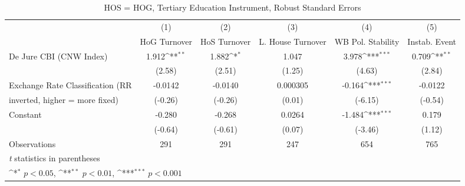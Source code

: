 \begin{table}[htbp]\centering
\def\sym#1{\ifmmode^{#1}\else\(^{#1}\)\fi}
\caption{HOS = HOG, Tertiary Education Instrument, Robust Standard Errors \label{hoshogfivs}}
\begin{tabular}{l*{5}{c}}
\toprule
                                        &\multicolumn{1}{c}{(1)}&\multicolumn{1}{c}{(2)}&\multicolumn{1}{c}{(3)}&\multicolumn{1}{c}{(4)}&\multicolumn{1}{c}{(5)}\\
                                        &\multicolumn{1}{c}{HoG Turnover}&\multicolumn{1}{c}{HoS Turnover}&\multicolumn{1}{c}{L. House Turnover}&\multicolumn{1}{c}{WB Pol. Stability}&\multicolumn{1}{c}{Instab. Event}\\
\midrule
De Jure CBI (CNW Index)                 &    1.912\sym{**} &    1.882\sym{*}  &    1.047         &    3.978\sym{***}&    0.709\sym{**} \\
                                        &   (2.58)         &   (2.51)         &   (1.25)         &   (4.63)         &   (2.84)         \\
\addlinespace
Exchange Rate Classification (RR        &  -0.0142         &  -0.0140         & 0.000305         &   -0.164\sym{***}&  -0.0122         \\
inverted, higher = more fixed)          &  (-0.26)         &  (-0.26)         &   (0.01)         &  (-6.15)         &  (-0.54)         \\
\addlinespace
Constant                                &   -0.280         &   -0.268         &   0.0264         &   -1.484\sym{***}&    0.179         \\
                                        &  (-0.64)         &  (-0.61)         &   (0.07)         &  (-3.46)         &   (1.12)         \\
\midrule
Observations                            &      291         &      291         &      247         &      654         &      765         \\
\bottomrule
\multicolumn{6}{l}{\footnotesize \textit{t} statistics in parentheses}\\
\multicolumn{6}{l}{\footnotesize \sym{*} \(p<0.05\), \sym{**} \(p<0.01\), \sym{***} \(p<0.001\)}\\
\end{tabular}
\end{table}

